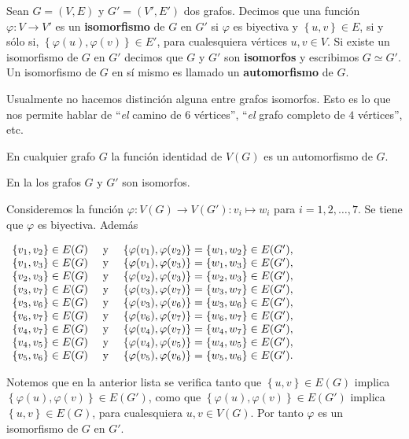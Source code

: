 \begin{Def}
   Sean $G=(V,E)$ y $G'=(V',E')$ dos grafos. Decimos que una función $\varphi:V\to V'$ es un \textbf{isomorfismo} de $G$ en $G'$ si $\varphi$ es biyectiva y $\left\lbrace u,v\right\rbrace\in E$, si y sólo si, $\left\lbrace \varphi(u), \varphi(v)\right\rbrace\in E'$, para cualesquiera vértices $u,v\in V$. Si existe un isomorfismo de $G$ en $G'$ decimos que $G$ y $G'$ son \textbf{isomorfos} y escribimos $G\simeq G'$. Un isomorfismo de $G$ en sí mismo es llamado un \textbf{automorfismo} de $G$.
\end{Def}
Usualmente no hacemos distinción alguna entre grafos isomorfos. Esto es lo que nos permite hablar de ``\textit{el} camino de $6$ vértices'', ``\textit{el} grafo completo de $4$ vértices'', etc.
\begin{Obs}
   En cualquier grafo $G$ la función identidad de $V(G)$ es un automorfismo de $G$.
\end{Obs}
\begin{Ejm}
   En la  los grafos $G$ y $G'$ son isomorfos. 
   
   Consideremos la función $\varphi:V(G)\to V(G'):v_i\mapsto w_i$ para $i=1,2,\dots ,7$. Se tiene que $\varphi$ es biyectiva. Además
   \begin{center}
   $\hfill
   \begin{array}{rcl}
      \{v_1, v_2\} \in E(G) &\text{ y }& \{\varphi(v_1), \varphi(v_2)\} = \{w_1, w_2\} \in E(G'), \\
      \{v_1, v_3\} \in E(G) &\text{ y }& \{\varphi(v_1), \varphi(v_3)\} = \{w_1, w_3\} \in E(G'), \\
      \{v_2, v_3\} \in E(G) &\text{ y }& \{\varphi(v_2), \varphi(v_3)\} = \{w_2, w_3\} \in E(G'), \\
      \{v_3, v_7\} \in E(G) &\text{ y }& \{\varphi(v_3), \varphi(v_7)\} = \{w_3, w_7\} \in E(G'), \\
      \{v_3, v_6\} \in E(G) &\text{ y }& \{\varphi(v_3), \varphi(v_6)\} = \{w_3, w_6\} \in E(G'), \\
      \{v_6, v_7\} \in E(G) &\text{ y }& \{\varphi(v_6), \varphi(v_7)\} = \{w_6, w_7\} \in E(G'), \\
      \{v_4, v_7\} \in E(G) &\text{ y }& \{\varphi(v_4), \varphi(v_7)\} = \{w_4, w_7\} \in E(G'), \\
      \{v_4, v_5\} \in E(G) &\text{ y }& \{\varphi(v_4), \varphi(v_5)\} = \{w_4, w_5\} \in E(G'), \\
      \{v_5, v_6\} \in E(G) &\text{ y }& \{\varphi(v_5), \varphi(v_6)\} = \{w_5, w_6\} \in E(G').
   \end{array}
   \hfill$
   \end{center}
   Notemos que en la anterior lista se verifica tanto que $\left\lbrace u,v\right\rbrace\in E(G)$ implica $\left\lbrace \varphi(u), \varphi(v) \right\rbrace \allowbreak \in E(G')$, como que $\left\lbrace \varphi(u), \varphi(v)\right\rbrace\in E(G')$ implica $\left\lbrace u,v\right\rbrace\in E(G)$, para cualesquiera $u,v\in V(G)$. Por tanto $\varphi$ es un isomorfismo de $G$ en $G'$.
\end{Ejm}
